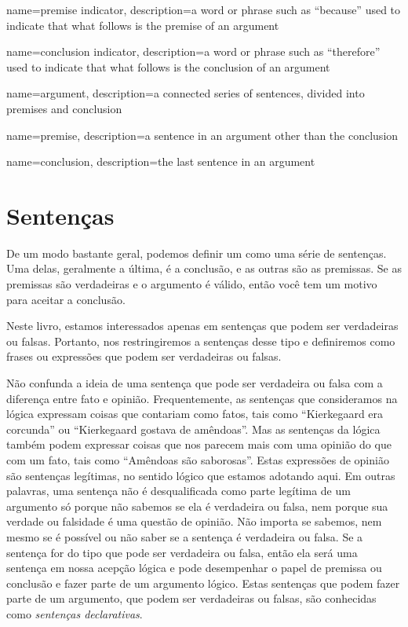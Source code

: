 

{
name=premise indicator,
description={a word or phrase such as ``because'' used to indicate that what follows is the premise of an argument}
}

{
name=conclusion indicator,
description={a word or phrase such as ``therefore'' used to indicate that what follows is the conclusion of an argument}
}

{
name=argument,
description={a connected series of sentences, divided into \gls{premise}s and \gls{conclusion}}
}

{
name=premise,
description={a sentence in an \gls{argument} other than the \gls{conclusion}}
}

{
name=conclusion,
description={the last sentence in an \gls{argument}}
}


\section{Sentenças}
\label{intro.sentences}

De um modo bastante geral, podemos definir um  como uma série de sentenças.
Uma delas, geralmente a última, é a conclusão, e as outras são as premissas.
Se as premissas são verdadeiras e o argumento é válido, então você tem um motivo para aceitar a conclusão.

Neste livro, estamos interessados apenas em sentenças que podem ser verdadeiras ou falsas.
Portanto, nos restringiremos a sentenças desse tipo e definiremos  como frases ou expressões que podem ser verdadeiras ou falsas.

Não confunda a ideia de uma sentença que pode ser verdadeira ou falsa com a diferença entre fato e opinião.
Frequentemente, as sentenças que consideramos na lógica expressam coisas que contariam como fatos, tais como ``Kierkegaard era corcunda'' ou ``Kierkegaard gostava de amêndoas''.
Mas as sentenças da lógica também podem expressar coisas que nos parecem mais com uma opinião do que com um fato, tais como ``Amêndoas são saborosas''.
Estas expressões de opinião são sentenças legítimas, no sentido lógico que estamos adotando aqui.
Em outras palavras, uma sentença não é desqualificada como parte legítima de um argumento só porque não sabemos se ela é verdadeira ou falsa, nem porque sua verdade ou falsidade é uma questão de opinião.
Não importa se sabemos, nem mesmo se é possível ou não saber se a sentença é verdadeira ou falsa.
Se a sentença for do tipo que pode ser verdadeira ou falsa, então ela será uma sentença em nossa acepção lógica  e pode desempenhar o papel de premissa ou conclusão e fazer parte de um argumento lógico.
Estas sentenças que podem fazer parte de um argumento, que podem ser verdadeiras ou falsas, são conhecidas como \emph{sentenças declarativas}.

